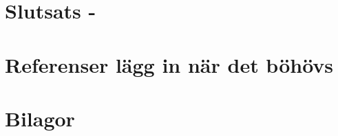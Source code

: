 \documentclass{article}
\begin{document}
\section{Slutsats -}

\section{Referenser lägg in när det böhövs}


\section{Bilagor}
\end{document}
